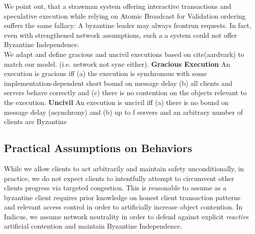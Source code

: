 We point out, that a strawman system offering interactive transactions and speculative execution while relying on Atomic Broadcast for Validation ordering suffers the same fallacy: A byzantine leader may always frontrun requests. In fact, even with strengthened network assumptions, such a a system could not offer Byzantine Independence.\\

We adapt and define gracious and uncivil executions based on cite(aardvark) to match our model. (i.e. network not sync either).
\textbf{Gracious Execution}
An execution is gracious iff (a) the execution is synchronous with some
implementation-dependent short bound on message delay (b) all clients and servers behave correctly and (c) there is no contention on the objects relevant to the execution.
\textbf{Uncivil}
An execution is uncivil iff (a) there is no bound on message delay (asynchrony) and (b) up to f servers and an arbitrary number of clients are Byzantine 


\subsection{Practical Assumptions on Behaviors}
While we allow clients to act arbitrarily and maintain safety unconditionally, in practice, we do not expect clients to intentfully attempt to circumvent other clients progress via targeted congestion. This is reasonable to assume as a byzantine client requires prior knowledge on honest client transaction patterns and relevant access control  in order to artificially increase object contention. 
In Indicus, we assume network neutrality in order to defend against explicit \textit{reactive} artificial contention and maintain Byzantine Independence.

